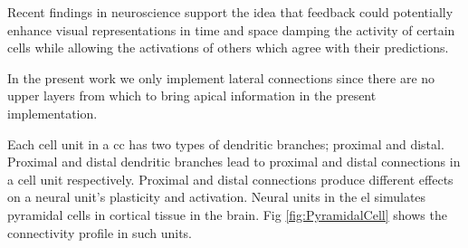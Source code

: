 {Recent findings in neuroscience \cite{Marques2018} support the idea 
that feedback could potentially enhance visual representations in time and space
damping the activity of certain cells while allowing the activations  of others
which agree with their predictions.

In the present work we only implement lateral connections since
there are no upper layers 
from which to bring apical information in the present implementation.

Each cell unit in a \gls{cc} has two types of dendritic branches; proximal and distal.
Proximal and distal dendritic branches lead to proximal and distal connections in a cell unit respectively.
Proximal and distal connections produce different effects on a neural unit's plasticity and activation.
Neural units in the \gls{el} simulates pyramidal cells in cortical tissue in the brain.
Fig \ref{fig:PyramidalCell} shows the connectivity profile in such units. 
}
































